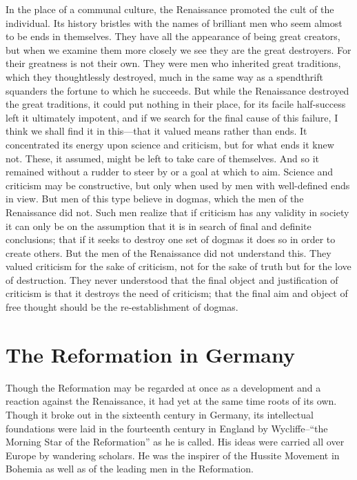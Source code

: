 \documentclass{book}
\begin{document}
In the place of a communal culture, the Renaissance promoted the cult of the individual. Its history bristles with the names of brilliant men who seem almost to be ends in themselves. They have all the appearance of being great creators, but when we examine them more closely we see they are the great destroyers. For their greatness is not their own. They were men who inherited great traditions, which they thoughtlessly destroyed, much in the same way as a spendthrift squanders the fortune to which he succeeds. But while the Renaissance destroyed the great traditions, it could put nothing in their place, for its facile half-success left it ultimately impotent, and if we search for the final cause of this failure, I think we shall find it in this—that it valued means rather than ends. It concentrated its energy upon science and criticism, but for what ends it knew not. These, it assumed, might be left to take care of themselves. And so it remained without a rudder to steer by or a goal at which to aim. Science and criticism may be constructive, but only when used by men with well-defined ends in view. But men of this type believe in dogmas, which the men of the Renaissance did not. Such men realize that if criticism has any validity in society it can only be on the assumption that it is in search of final and definite conclusions; that if it seeks to destroy one set of dogmas it does so in order to create others. But the men of the Renaissance did not understand this. They valued criticism for the sake of criticism, not for the sake of truth but for the love of destruction. They never understood that the final object and justification of criticism is that it destroys the need of criticism; that the final aim and object of free thought should be the re-establishment of dogmas.

\chapter{The Reformation in Germany}
\label{chapter-10}
Though the Reformation may be regarded at once as a development and a reaction against the Renaissance, it had yet at the same time roots of its own. Though it broke out in the sixteenth century in Germany, its intellectual foundations were laid in the fourteenth century in England by Wycliffe–“the Morning Star of the Reformation” as he is called. His ideas were carried all over Europe by wandering scholars. He was the inspirer of the Hussite Movement in Bohemia as well as of the leading men in the Reformation.
\end{document}
